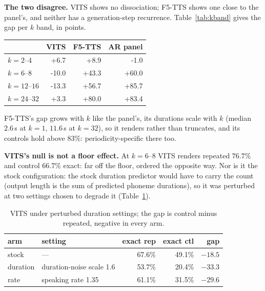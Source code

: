 \noindent\textbf{The two disagree.} VITS shows no dissociation;
F5-TTS shows one close to the panel's, and neither has a
generation-step recurrence. Table~\ref{tab:kband} gives the gap per $k$ band,
in points.

\par\medskip\noindent\begin{minipage}{\columnwidth}
\label{tab:kband}
\centering
\begin{tabular}{lrrr}
\toprule
 & VITS & F5-TTS & AR panel \\
\midrule
$k=2$--$4$ & +6.7 & +8.9 & -1.0 \\
$k=6$--$8$ & -10.0 & +43.3 & +60.0 \\
$k=12$--$16$ & -13.3 & +56.7 & +85.7 \\
$k=24$--$32$ & +3.3 & +80.0 & +83.4 \\
\bottomrule
\end{tabular}
\end{minipage}\par\medskip


F5-TTS's gap grows with $k$ like the panel's, its durations scale with
$k$ (median $2.6$\,s at $k{=}1$, $11.6$\,s at $k{=}32$), so it renders
rather than truncates, and its controls hold above $83\%$:
periodicity-specific there too.

\noindent\textbf{VITS's null is not a floor effect.} At $k=6$--$8$
VITS renders repeated $76.7\%$ and control $66.7\%$ exact: far off the
floor, ordered the opposite way. Nor is it the stock configuration:
the stock duration predictor would have to carry the count (output
length is the sum of predicted phoneme durations), so it was perturbed
at two settings chosen to degrade it (Table~\ref{tab:vitscfg}).

\begin{table}[tp]\centering
\caption{VITS under perturbed duration settings; the gap is control minus repeated, negative in every arm.}
\label{tab:vitscfg}
\begin{tabular}{llrrr}
\toprule
arm & setting & exact rep & exact ctl & gap \\
\midrule
stock     & ---                       & 67.6\% & 49.1\% & $-18.5$ \\
duration  & duration-noise scale 1.6  & 53.7\% & 20.4\% & $-33.3$ \\
rate      & speaking rate 1.35        & 61.1\% & 31.5\% & $-29.6$ \\
\bottomrule
\end{tabular}
\end{table}

